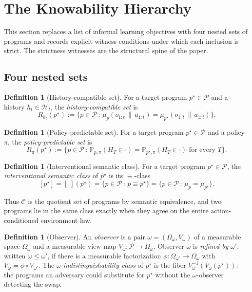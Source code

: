 \documentclass[11pt]{article}
\theoremstyle{definition}
\newtheorem{definition}[theorem]{Definition}
\theoremstyle{remark}
\theoremstyle{plain}
\theoremstyle{definition}
\newcommand{\Ccal}{\mathcal{C}}
\newcommand{\Pcal}{\mathcal{P}}
\newcommand{\Hcal}{\mathcal{H}}
\newcommand{\Prob}{\mathbb{P}}
\newcommand{\givena}{\,\|\,}
\begin{document}
\section{The Knowability Hierarchy}
\label{sec:hierarchy}

This section replaces a list of informal learning objectives with four nested sets of programs and records explicit witness conditions under which each inclusion is strict. The strictness witnesses are the structural spine of the paper.

\subsection{Four nested sets}

\begin{definition}[History-compatible set]
\label{def:history-compat}
For a target program $p^\star\in\Pcal$ and a history $h_t\in\Hcal_t$, the \emph{history-compatible set} is
\[
R_{h_t}(p^\star)
:=
\bigl\{p\in\Pcal\,:\,\mu_p(o_{1:t}\givena a_{1:t})=\mu_{p^\star}(o_{1:t}\givena a_{1:t})\bigr\}.
\]
\end{definition}

\begin{definition}[Policy-predictable set]
\label{def:policy-pred}
For a target program $p^\star\in\Pcal$ and a policy $\pi$, the \emph{policy-predictable set} is
\[
R_\pi(p^\star)
:=
\bigl\{p\in\Pcal\,:\,\Prob_{p,\pi}(H_T\in\cdot)=\Prob_{p^\star,\pi}(H_T\in\cdot)\text{ for every }T\bigr\}.
\]
\end{definition}

\begin{definition}[Interventional semantic class]
\label{def:int-sem-class}
For a target program $p^\star\in\Pcal$, the \emph{interventional semantic class} of $p^\star$ is its $\equiv$-class
\[
[p^\star]
=
[\cdot](p^\star)
=
\bigl\{p\in\Pcal\,:\,p\equiv p^\star\bigr\}
=
\bigl\{p\in\Pcal\,:\,\mu_p=\mu_{p^\star}\bigr\}.
\]
\end{definition}

Thus $\Ccal$ is the quotient set of programs by semantic equivalence, and two programs lie in the same class exactly when they agree on the entire action-conditioned environment law.

\begin{definition}[Observer]
\label{def:observer}
An \emph{observer} is a pair $\omega=(\Omega_\omega,V_\omega)$ of a measurable space $\Omega_\omega$ and a measurable view map $V_\omega:\Pcal\to\Omega_\omega$. Observer $\omega$ is \emph{refined by} $\omega'$, written $\omega\le\omega'$, if there is a measurable factorization $\phi:\Omega_{\omega'}\to\Omega_\omega$ with $V_\omega=\phi\circ V_{\omega'}$. The \emph{$\omega$-indistinguishability class} of $p^\star$ is the fiber $V_\omega^{-1}(V_\omega(p^\star))$: the programs an adversary could substitute for $p^\star$ without the $\omega$-observer detecting the swap.
\end{definition}
\end{document}
